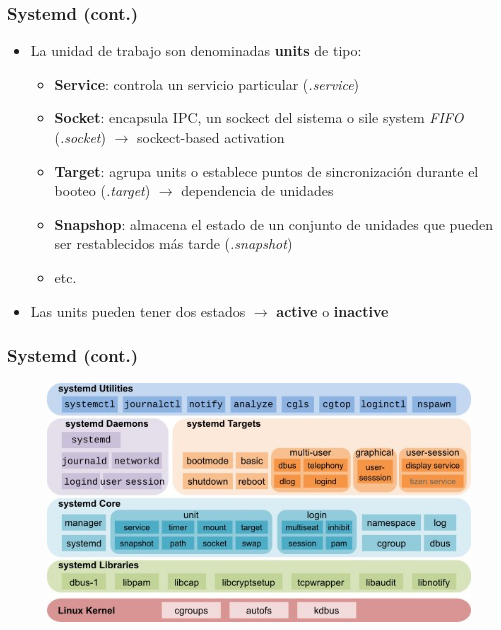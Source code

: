\begin{frame}
  	\frametitle{\textbf{Systemd} (cont.)}
  	\begin{itemize}
		\item La unidad de trabajo son denominadas \textbf{units} de tipo:
		\begin{itemize}
			\item \textbf{Service}: controla un servicio particular (\emph{.service})
			\item \textbf{Socket}: encapsula IPC, un sockect del sistema o sile system \emph{FIFO} (\emph{.socket}) $\rightarrow$ sockect-based activation
			\item \textbf{Target}: agrupa units o establece puntos de sincronización durante el booteo (\emph{.target}) $\rightarrow$ dependencia de unidades
			\item \textbf{Snapshop}: almacena el estado de un conjunto de unidades que pueden ser restablecidos más tarde (\emph{.snapshot})
			\item etc.
		\end{itemize}
		\item Las units pueden tener dos estados $\rightarrow$ \textbf{active} o \textbf{inactive}
  	\end{itemize}
\end{frame}

\begin{frame}
  \frametitle{\textbf{Systemd} (cont.)}
  \begin{figure}
	    \includegraphics[scale=0.3]{images/systemd.jpg}
  \end{figure}
\end{frame}

